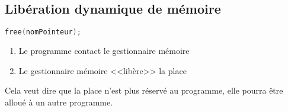 \subsection{Libération dynamique de mémoire}
\begin{lstlisting}[language=C, numbers=none,frame=none, caption=Syntaxe de libération de mémoire]
free(nomPointeur);
\end{lstlisting}
\begin{enumerate}
	\item Le programme contact le gestionnaire mémoire 
	\item Le gestionnaire mémoire <<libère>> la place
\end{enumerate}

Cela veut dire que la place n'est plus réservé au programme, elle pourra être alloué à un autre programme.

